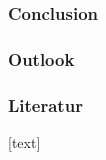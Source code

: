 \documentclass[aspectratio=169]{beamer}
\begin{document}
\begin{frame}
 \frametitle{Conclusion}
\end{frame}

\begin{frame}
 \frametitle{Outlook}
\end{frame}

\begin{frame}
%
\frametitle{Literatur}
\small{}[text]


\end{frame}
\end{document}

